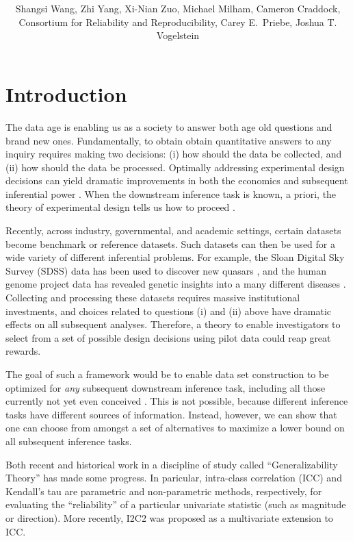 \documentclass{article}
\title{\vspace{-50pt}
\db{Optimal Design for Discovery Science: Applications in Neuroimaging}
}
\author{Shangsi Wang, Zhi Yang, Xi-Nian Zuo, Michael Milham, Cameron Craddock,  \\ Consortium for Reliability and Reproducibility, Carey E.~Priebe, Joshua T. Vogelstein}
\begin{document}
\maketitle

\section{Introduction}

The data age is enabling us as a society to answer both age old questions and brand new ones.  Fundamentally, to obtain obtain quantitative answers to any inquiry requires making two decisions: (i) how should the data be collected, and (ii) how should the data be processed.  Optimally addressing experimental design decisions can yield dramatic improvements in both the economics and subsequent inferential power \cite{}.  When the downstream inference task is known, a priori, the theory of experimental design tells us how to proceed \cite{Fisher1935}. 


Recently, across industry, governmental, and academic settings, certain datasets become benchmark or reference datasets.  Such datasets can then be used for a wide variety of different inferential problems. For example, the Sloan Digital Sky Survey (SDSS) data has been used to discover new quasars \cite{}, and the human genome project data has revealed genetic insights into a many different diseases \cite{}.  Collecting and processing these datasets requires massive institutional investments, and choices related to questions (i) and (ii) above have dramatic effects on all subsequent analyses.  Therefore, a  theory to enable investigators to select from a set of possible design decisions using pilot data could reap great rewards.

The goal of such a framework would be to enable data set construction to be optimized for \emph{any} subsequent downstream inference task, including all those currently not yet even conceived \cite{Stanford2006}.  This is not possible, because different inference tasks have different sources of information.  
Instead, however, we can show that one can choose from amongst a set of alternatives to maximize a lower bound on all subsequent inference tasks.  

Both recent and historical work in a discipline of study called ``Generalizability Theory'' has made some progress.  In paricular,  intra-class correlation (ICC) \cite{Shroud1979} and Kendall's tau \cite{Kendall1938} are parametric and non-parametric methods, respectively, for evaluating the ``reliability'' of a particular univariate statistic (such as magnitude or direction).  More recently, I2C2 was proposed \cite{Shou2013} as a multivariate extension to ICC.   
\end{document}
